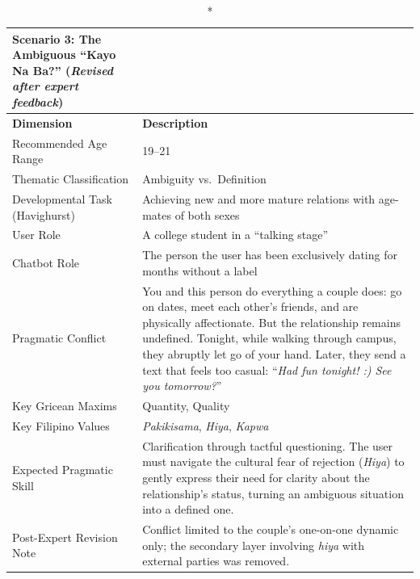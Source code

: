 \begin{longtable}{p{4.5cm} p{11cm}}
\caption*{Scenario 3: The Ambiguous ``Kayo Na Ba?'' \textnormal{(\textit{Revised after expert feedback})}} \\
\toprule
\textbf{Dimension} & \textbf{Description} \\
\midrule
\endhead
Recommended Age Range          & 19--21 \\
\midrule
Thematic Classification        & Ambiguity vs.\ Definition \\
\midrule
Developmental Task (Havighurst)& Achieving new and more mature relations with age-mates of both sexes \\
\midrule
User Role                      & A college student in a ``talking stage'' \\
\midrule
Chatbot Role                   & The person the user has been exclusively dating for months without a
                                 label \\
\midrule
Pragmatic Conflict             & You and this person do everything a couple does: go on dates, meet each
                                 other's friends, and are physically affectionate. But the relationship
                                 remains undefined. Tonight, while walking through campus, they abruptly
                                 let go of your hand. Later, they send a text that feels too casual:
                                 ``\textit{Had fun tonight! :) See you tomorrow?}'' \\
\midrule
Key Gricean Maxims             & Quantity, Quality \\
\midrule
Key Filipino Values            & \textit{Pakikisama}, \textit{Hiya}, \textit{Kapwa} \\
\midrule
Expected Pragmatic Skill       & Clarification through tactful questioning. The user must navigate the
                                 cultural fear of rejection (\textit{Hiya}) to gently express their need
                                 for clarity about the relationship's status, turning an ambiguous situation
                                 into a defined one. \\
\midrule
Post-Expert Revision Note      & Conflict limited to the couple's one-on-one dynamic only; the secondary
                                 layer involving \textit{hiya} with external parties was removed. \\
\bottomrule
\end{longtable}
 
